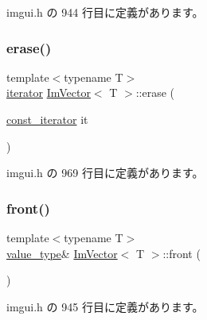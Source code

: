  imgui.\+h の 944 行目に定義があります。

\mbox{\label{class_im_vector_a1e1fd9b678be9d4b4432fbefde976045}} 
\subsubsection{\texorpdfstring{erase()}{erase()}}
{\footnotesize\ttfamily template$<$typename T$>$ \\
\mbox{\hyperlink{class_im_vector_a74b5478f1f6fd471cc71219bce483db6}{iterator}} \mbox{\hyperlink{class_im_vector}{Im\+Vector}}$<$ T $>$\+::erase (\begin{DoxyParamCaption}\item[{\mbox{\hyperlink{class_im_vector_aedeac9c5080f9d6ce96ae837768ee4c4}{const\+\_\+iterator}}}]{it }\end{DoxyParamCaption})\hspace{0.3cm}{\ttfamily [inline]}}



 imgui.\+h の 969 行目に定義があります。

\mbox{\label{class_im_vector_a5b0108d6b1a4a11609723f8305fb9011}} 
\subsubsection{\texorpdfstring{front()}{front()}\hspace{0.1cm}{\footnotesize\ttfamily [1/2]}}
{\footnotesize\ttfamily template$<$typename T$>$ \\
\mbox{\hyperlink{class_im_vector_a8bd77e4e7581d8e5f9e98d7c2f3c2a80}{value\+\_\+type}}\& \mbox{\hyperlink{class_im_vector}{Im\+Vector}}$<$ T $>$\+::front (\begin{DoxyParamCaption}{ }\end{DoxyParamCaption})\hspace{0.3cm}{\ttfamily [inline]}}



 imgui.\+h の 945 行目に定義があります。

\mbox{\label{class_im_vector_a76dc6bb045574ba79b15a1941b662597}} 
